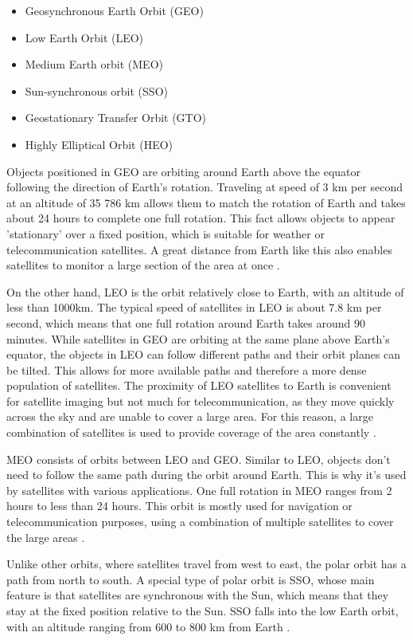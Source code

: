 \begin{itemize}
    \item Geosynchronous Earth Orbit (GEO)
    \item Low Earth Orbit (LEO)
    \item Medium Earth orbit (MEO)
    \item Sun-synchronous orbit (SSO)
    \item Geostationary Transfer Orbit (GTO)
    \item Highly Elliptical Orbit (HEO)
\end{itemize}

Objects positioned in GEO are orbiting around Earth above the equator following the direction of Earth’s rotation. Traveling at speed of 3 km per second at an altitude of 35 786 km allows them to match the rotation of Earth and takes about 24 hours to complete one full rotation. 
This fact allows objects to appear 'stationary' over a fixed position, which is suitable for weather or telecommunication satellites. 
A great distance from Earth like this also enables satellites to monitor a large section of the area at once \cite{ESAarticle}.

On the other hand, LEO is the orbit relatively close to Earth, with an altitude of less than 1000km. The typical speed of satellites in LEO is about 7.8 km per second, which means that one full rotation around Earth takes around 90 minutes.
While satellites in GEO are orbiting at the same plane above Earth's equator, the objects in LEO can follow different paths and their orbit planes can be tilted. This allows for more available paths and therefore a more dense population of satellites. 
The proximity of LEO satellites to Earth is convenient for satellite imaging but not much for telecommunication, as they move quickly across the sky and are unable to cover a large area. For this reason, a large combination of satellites is used to provide coverage of the area constantly \cite{ESAarticle}.

MEO consists of orbits between LEO and GEO. Similar to LEO, objects don't need to follow the same path during the orbit around Earth. This is why it's used by satellites with various applications.
One full rotation in MEO ranges from 2 hours to less than 24 hours. 
This orbit is mostly used for navigation or telecommunication purposes, using a combination of multiple satellites to cover the large areas \cite{ESAarticle}.

Unlike other orbits, where satellites travel from west to east, the polar orbit has a path from north to south. A special type of polar orbit is SSO, whose main feature is that satellites are synchronous with the Sun, which means that they stay at the fixed position relative to the Sun. SSO falls into the low Earth orbit, with an altitude ranging from 600 to 800 km from Earth \cite{ESAarticle}. 

